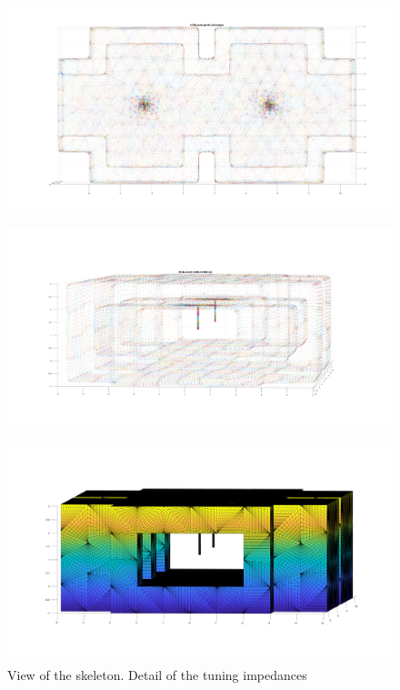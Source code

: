 \documentclass[11pt, oneside]{article}   	%
\begin{document}
\begin{figure}[H]
\begin{center}
\includegraphics[width=6in]{two_cavity_filter_2.pdf}
\end{center}
\caption{}
\label{two_cavity_filter_2}
\end{figure}

\begin{figure}[H]
\begin{center}
\includegraphics[width=6in]{two_cavity_filter_3.pdf}
\end{center}
\caption{}
\label{two_cavity_filter_3}
\end{figure}



\begin{figure}[H]
\begin{center}
\includegraphics[width=6in]{two_cavity_filter_skeleton.pdf}
\end{center}
\caption{View of the skeleton. Detail of the tuning impedances}
\label{two_cavity_filter_skeleton}
\end{figure}
\end{document}
